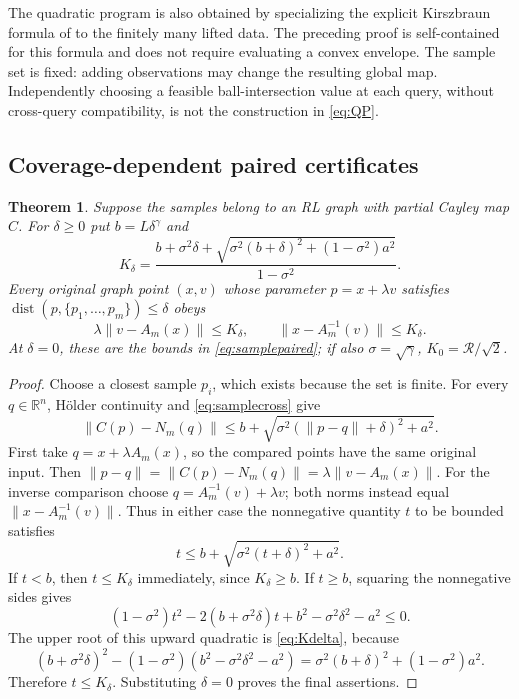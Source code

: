 \documentclass[11pt]{article}
\numberwithin{equation}{section}
\newtheorem{theorem}{Theorem}[section]
\theoremstyle{definition}
\theoremstyle{remark}
\newcommand{\R}{\mathbb R}
\newcommand{\dist}{\operatorname{dist}}
\newcommand{\rad}{\mathcal R}
\newcommand{\norm}[1]{\lVert #1\rVert}
\begin{document}
The quadratic program is also obtained by specializing the explicit
Kirszbraun formula of \cite{AzagraLeGruyerMudarra} to the finitely many
lifted data. The preceding proof is self-contained for this formula and
does not require evaluating a convex envelope. The sample set is fixed:
adding observations may change the resulting global map. Independently
choosing a feasible ball-intersection value at each query, without
cross-query compatibility, is not the construction in
\eqref{eq:QP}.

\subsection{Coverage-dependent paired certificates}

\begin{theorem}\label{thm:covered}
Suppose the samples belong to an RL graph with partial Cayley map $C$.
For $\delta\ge0$ put $b=L\delta^\gamma$ and
\begin{equation}\label{eq:Kdelta}
 K_\delta=
 \frac{b+\sigma^2\delta+
 \sqrt{\sigma^2(b+\delta)^2+(1-\sigma^2)a^2}}
 {1-\sigma^2}.
\end{equation}
Every original graph point $(x,v)$ whose parameter
$p=x+\lambda v$ satisfies
$\dist(p,\{p_1,\ldots,p_m\})\le\delta$ obeys
\begin{equation}\label{eq:coveredpaired}
 \lambda\norm{v-A_m(x)}\le K_\delta,
 \qquad \norm{x-A_m^{-1}(v)}\le K_\delta.
\end{equation}
At $\delta=0$, these are the bounds in
\eqref{eq:samplepaired}; if also $\sigma=\sqrt\gamma$,
$K_0=\rad/\sqrt2$.
\end{theorem}

\begin{proof}
Choose a closest sample $p_i$, which exists because the set is finite.
For every $q\in\R^n$, H\"older continuity and
\eqref{eq:samplecross} give
\begin{equation}\label{eq:coveragecross}
 \norm{C(p)-N_m(q)}
 \le b+\sqrt{\sigma^2(\norm{p-q}+\delta)^2+a^2}.
\end{equation}
First take $q=x+\lambda A_m(x)$, so the compared points have the
same original input. Then
$\norm{p-q}=\norm{C(p)-N_m(q)}=\lambda\norm{v-A_m(x)}$.
For the inverse comparison choose
$q=A_m^{-1}(v)+\lambda v$; both norms instead equal
$\norm{x-A_m^{-1}(v)}$. Thus in either case the nonnegative quantity
$t$ to be bounded satisfies
\[
 t\le b+\sqrt{\sigma^2(t+\delta)^2+a^2}.
\]
If $t<b$, then $t\le K_\delta$ immediately, since
$K_\delta\ge b$. If $t\ge b$, squaring the nonnegative sides gives
\[
 (1-\sigma^2)t^2-2(b+\sigma^2\delta)t
             +b^2-\sigma^2\delta^2-a^2\le0.
\]
The upper root of this upward quadratic is \eqref{eq:Kdelta}, because
\[
 (b+\sigma^2\delta)^2
 -(1-\sigma^2)(b^2-\sigma^2\delta^2-a^2)
 =\sigma^2(b+\delta)^2+(1-\sigma^2)a^2.
\]
Therefore $t\le K_\delta$. Substituting $\delta=0$ proves the final
assertions.
\end{proof}
\end{document}
